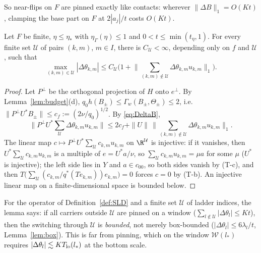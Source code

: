 So near-flips on $F$ are pinned exactly like contacts: wherever $\|\Delta
B\|_1=O(Kt)$, clamping the base part on $F$ at $2|a_j|/t$ costs $O(Kt)$.

\begin{lemma}\label{lem:boundedfree}
Let $F$ be finite, $\eta\le\eta_*$ with $\eta_\Gamma(\eta)\le1$ and
$0<t\le\min(t_\eta,1)$.  For every finite set $\mathcal U$ of pairs $(k,m)$,
$m\in I$, there is $C_{\mathcal U}<\infty$, depending only on $f$ and $\mathcal U$, such that
\[
 \max_{(k,m)\in\mathcal U}|\Delta\theta_{k,m}|\le C_{\mathcal U}\Big(1+\Big\|\sum_{(k,m)\notin\mathcal U}
 \Delta\theta_{k,m}u_{k,m}\Big\|_1\Big).
\]
\end{lemma}

\begin{proof}
Let $P^\perp$ be the orthogonal projection of $H$ onto $e^\perp$.  By
Lemma~\ref{lem:budget}(d), $q_0h(B_\pm)\le\Gamma_w(B_\pm,\Theta_\pm)\le2$,
i.e.\ $\|P^\perp U^*B_\pm\|\le c_f:=(2\nu/q_0)^{1/2}$.  By
\eqref{eq:DeltaB},
\[
 \Big\|P^\perp U^*\sum_{\mathcal U}\Delta\theta_{k,m}u_{k,m}\Big\|\le2c_f+\|U\|\,
 \Big\|\sum_{(k,m)\notin\mathcal U}\Delta\theta_{k,m}u_{k,m}\Big\|_1 .
\]
The linear map $c\mapsto P^\perp U^*\sum_{\mathcal U}c_{k,m}u_{k,m}$ on $\R^{\mathcal U}$ is
injective: if it vanishes, then $U^*\sum_{\mathcal U}c_{k,m}u_{k,m}$ is a multiple of
$e=U^*a/\nu$, so $\sum_{\mathcal U}c_{k,m}u_{k,m}=\mu a$ for some $\mu$ ($U^*$ is
injective); the left side lies in $Y$ and $a\in c_{00}$, so both sides
vanish by (T-c), and then $T\big(\sum_{\mathcal U}(c_{k,m}/q^*(Te_{k,m}))e_{k,m}
\big)=0$ forces $c=0$ by (T-b).  An injective linear map on a
finite-dimensional space is bounded below.
\end{proof}

For the operator of Definition~\ref{def:SLD} and a finite set $\mathcal U$ of ladder
indices, the lemma says: if all carriers outside $\mathcal U$ are pinned on a window
($\sum_{l\notin\mathcal U}|\Delta\theta_l|\le Kt$), then the switching through $\mathcal U$
is \emph{bounded}, not merely box-bounded ($|\Delta\theta_l|\le6\lambda_l/t$,
Lemma~\ref{lem:box}).  This is far from pinning, which on the window
$\mathcal W(l_*)$ requires $|\Delta\theta_l|\lesssim KT_{\rm lo}(l_*)$ at
the bottom scale.
